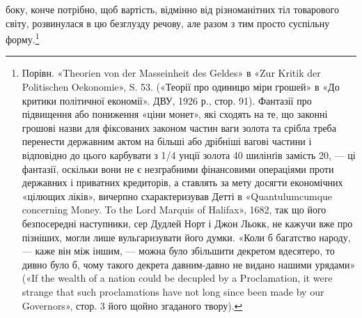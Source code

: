 \parcont{}  %
боку, конче потрібно, щоб вартість, відмінно від різноманітних
тіл товарового світу, розвинулася в цю безглузду речову, але
разом з тим просто суспільну форму.\footnote{
Порівн. «Theorien von der Masseinheit des Geldes» в «Zur Kritik
der Politischen Oekonomie», S. 53. («Теорії про одиницю міри грошей»
в «До критики політичної економії». ДВУ, 1926 р., стор. 91). Фантазії
про підвищення або пониження «ціни монет», які сходять на те, що законні
грошові назви для фіксованих законом частин ваги золота та срібла
треба перенести державним актом на більші або дрібніші вагові частини
і відповідно до цього карбувати з 1/4 унції золота 40 шилінґів замість 20, —
ці фантазії, оскільки вони не є незграбними фінансовими операціями проти
державних і приватних кредиторів, а ставлять за мету досягти економічних
«цілющих ліків», вичерпно схарактеризував Детті в «Quantulumcumque
concerning Money. To the Lord Marquis of Halifax», 1682, так
що його безпосередні наступники, сер Дудлей Норт і Джон Льокк,
не кажучи вже про пізніших, могли лише вульгаризувати його
думки. «Коли б багатство народу, — каже він між іншим, — можна
було збільшити декретом вдесятеро, то дивно було б, чому такого декрета
давним-давно не видано нашими урядами» («If the wealth of a nation
could be decupled by a Proclamation, it were strange that such proclamations
have not long since been made by our Governors», стор. 3 його щойно згаданого
твору).
}

